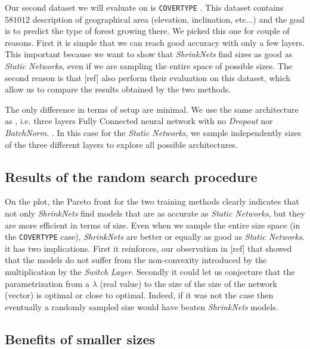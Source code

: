 Our second dataset we will evaluate on is \texttt{COVERTYPE} \cite{Blackard:1998:CNN:928509}. This dataset
contains $581012$ description of geographical area (elevation, inclination,
etc...) and the goal is to predict the type of forest growing there. We picked
this one for couple of reasons. First it is simple that we can reach good
accuracy with only a few layers. This important because we want to show that
\textit{ShrinkNets} find sizes as good as \textit{Static Networks}, even if we
are sampling the entire space of possible sizes. The second reason is that [ref]
also perform their evaluation on this dataset, which allow us to compare the
results obtained by the two methods.

The only difference in terms of setup are minimal. We use the same architecture
as \cite{Scardapane2017}, i.e. three layers Fully Connected neural network with  no
\textit{Dropout} \cite{Srivastava2014} nor \textit{BatchNorm}. . In this case for the \textit{Static Networks}, we sample
independently sizes of the three different layers to explore all possible
architectures.

\subsection{Results of the random search procedure}

On the plot, the Pareto front for the two training methods clearly indicates
that not only \textit{ShrinkNets} find models that are as accurate as
\textit{Static Networks}, but they are more efficient in terms of size. Even
when we sample the entire size space (in the \texttt{COVERTYPE} case),
\textit{ShrinkNets} are better or equally as good as \textit{Static Networks}.
it has two implications. First it reinforces, our observation in [ref] that
showed that the models do not suffer from the non-convexity introduced by the
multiplication by the \textit{Switch Layer}. Secondly it could let us conjecture
that the parametrization from a $\lambda$ (real value) to the size of the
size of the network (vector) is optimal or close to optimal. Indeed, if it was
not the case then eventually a randomly sampled size would have beaten
\textit{ShrinkNets} models. 

\subsection{Benefits of smaller sizes}

